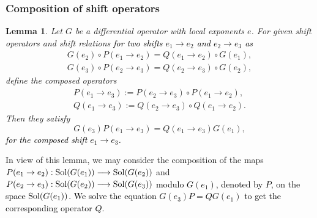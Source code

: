 \documentclass[a4paper,12pt]{article}
\newtheorem{lemma}[thm]{Lemma}
\theoremstyle{definition}
\theoremstyle{remark}
\numberwithin{equation}{section} %
\newcommand{\blue}[1]{\textcolor{black}{#1}}
\begin{document}
\subsubsection{Composition of shift operators}
\begin{lemma}\label{composition} Let $G$ be a differential operator with local exponents $e$.
For given shift operators and shift relations \blue{for two shifts $e_1\to e_2$ and $e_2\to e_3$ as}
\[\begin{array}{l}
 G(e_2)\circ P(e_1\rightarrow e_2) = Q(e_1\rightarrow e_2)\circ G(e_1), \\[1mm]
 G(e_3)\circ P(e_2\rightarrow e_3) = Q(e_2\rightarrow e_3)\circ G(e_2), 
\end{array}
\]
define the composed operators
\[\begin{array}{l}
P(e_1\rightarrow e_3):= P(e_2\rightarrow e_3)\circ P(e_1\rightarrow e_2), \\[1mm]
Q(e_1\rightarrow e_3):= Q(e_2\rightarrow e_3)\circ Q(e_1\rightarrow e_2). 
\end{array}
\]
Then they satisfy
\[G(e_3)P(e_1\rightarrow e_3) = Q(e_1\rightarrow e_3)G(e_1),\]
\blue{for the composed shift $e_1\to e_3$.}
\end{lemma}
%
In view of this lemma, we may consider %
the composition of the maps
$P(e_1\rightarrow e_2):{\rm Sol}(G(e_1))\longrightarrow {\rm Sol}(G(e_2))$
and 
$P(e_2\rightarrow e_3):{\rm Sol}(G(e_2))\longrightarrow {\rm Sol}(G(e_3))$
\blue{modulo $G(e_1)$, denoted by $P$, on the space ${\rm Sol}(G(e_1))$.
We solve the equation $G(e_3)P=QG(e_1)$ to get the corresponding operator $Q$.}
\end{document}
